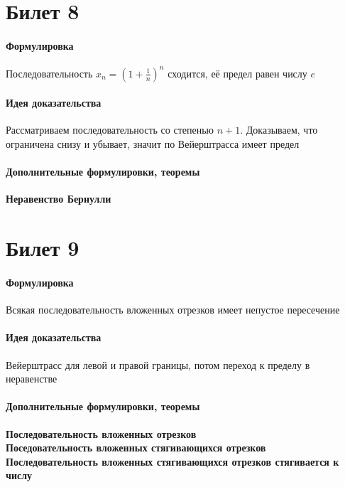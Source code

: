 \documentclass[a4paper,10pt]{article}
\begin{document}
	\section{Билет 8}
	\begin{center} 
		\item \paragraph{Формулировка} 
	\end{center}
	Последовательность $x_{n} = (1+\frac{1}{n})^{n}$ сходится, её предел равен числу $e$
	\begin{center} 
		\item \paragraph{Идея доказательства} 
	\end{center}
	Рассматриваем последовательность со степенью $n+1$. Доказываем, что ограничена снизу и убывает, значит по Вейерштрасса имеет предел
	\begin{center} 
		\item \paragraph{Дополнительные формулировки, теоремы} 
	\end{center}
	\textbf{Неравенство Бернулли}
	\section{Билет 9}
	\begin{center} 
		\item \paragraph{Формулировка} 
	\end{center}
	Всякая последовательность вложенных отрезков имеет непустое пересечение
	\begin{center} 
		\item \paragraph{Идея доказательства} 
	\end{center}
	Вейерштрасс для левой и правой границы, потом переход к пределу в неравенстве
	\begin{center} 
		\item \paragraph{Дополнительные формулировки, теоремы} 
	\end{center}
	\textbf{Последовательность вложенных отрезков} \\
	\textbf{Поседовательность вложенных стягивающихся отрезков} \\
	\textbf{Последовательность вложенных стягивающихся отрезков стягивается к числу} \\
\end{document}
